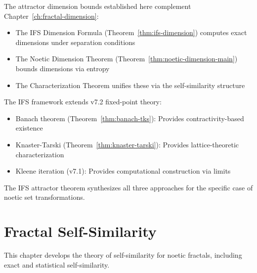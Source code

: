 \begin{remark}
\label{rem:connection-chapter2}
The attractor dimension bounds established here complement Chapter~\ref{ch:fractal-dimension}:
\begin{itemize}
  \item The IFS Dimension Formula (Theorem~\ref{thm:ifs-dimension}) computes exact dimensions under separation conditions
  \item The Noetic Dimension Theorem (Theorem~\ref{thm:noetic-dimension-main}) bounds dimensions via entropy
  \item The Characterization Theorem unifies these via the self-similarity structure
\end{itemize}
\end{remark}

\begin{remark}
\label{rem:connection-v72}
The IFS framework extends v7.2 fixed-point theory:
\begin{itemize}
  \item Banach theorem (Theorem~\ref*{thm:banach-tks}): Provides contractivity-based existence
  \item Knaster-Tarski (Theorem~\ref*{thm:knaster-tarski}): Provides lattice-theoretic characterization
  \item Kleene iteration (v7.1): Provides computational construction via limits
\end{itemize}
The IFS attractor theorem synthesizes all three approaches for the specific case of noetic set transformations.
\end{remark}

\chapter{Fractal Self-Similarity}
\label{ch:self-similarity}

\begin{tcolorbox}[colback=blue!5!white,colframe=blue!75!black,title=\vnewthree]
This chapter develops the theory of self-similarity for noetic fractals, including exact and statistical self-similarity.
\end{tcolorbox}

